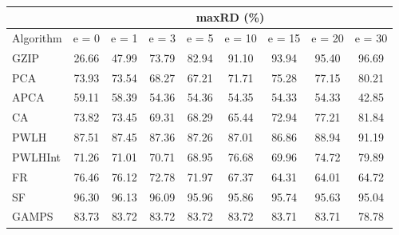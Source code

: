 \begin{table}[h]
\newcommand{\cpca}{\cellcolor{cyan!20}}
\newcommand{\capca}{\cellcolor{green!20}}
\newcommand{\cfr}{\cellcolor{yellow!25}}
\newcommand{\cgzip}{\cellcolor{orange!20}}
\newcommand{\best}{\cellcolor{gray!30}}
\centering\hspace*{0cm}\begin{tabular}{| l | c | c | c | c | c | c | c | c |}\cline{2-9}\multicolumn{1}{c|}{}& \multicolumn{8}{c|}{maxRD (\%)}\\\hline
{Algorithm} & {e = 0} & {e = 1} & {e = 3} & {e = 5} & {e = 10} & {e = 15} & {e = 20} & {e = 30} \\\hline
{GZIP\cgzip} & {\best26.66} & {\best47.99} & {73.79} & {82.94} & {91.10} & {93.94} & {95.40} & {96.69} \\\hline
{PCA\cpca} & {73.93} & {73.54} & {68.27} & {67.21} & {71.71} & {75.28} & {77.15} & {80.21} \\\hline
{APCA\capca} & {59.11} & {58.39} & {\best54.36} & {\best54.36} & {\best54.35} & {\best54.33} & {\best54.33} & {\best42.85} \\\hline
{CA} & {73.82} & {73.45} & {69.31} & {68.29} & {65.44} & {72.94} & {77.21} & {81.84} \\\hline
{PWLH} & {87.51} & {87.45} & {87.36} & {87.26} & {87.01} & {86.86} & {88.94} & {91.19} \\\hline
{PWLHInt} & {71.26} & {71.01} & {70.71} & {68.95} & {76.68} & {69.96} & {74.72} & {79.89} \\\hline
{FR\cfr} & {76.46} & {76.12} & {72.78} & {71.97} & {67.37} & {64.31} & {64.01} & {64.72} \\\hline
{SF} & {96.30} & {96.13} & {96.09} & {95.96} & {95.86} & {95.74} & {95.63} & {95.04} \\\hline
{GAMPS} & {83.73} & {83.72} & {83.72} & {83.72} & {83.72} & {83.71} & {83.71} & {78.78} \\\hline
\end{tabular}
\caption{\captionminmaxtwo}
\label{experiments:minmaxtwo}
\end{table}
